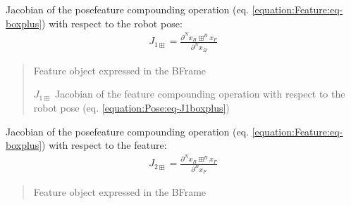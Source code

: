 \documentclass[letterpaper,10pt,english]{sphinxmanual}
\begin{document}
\begin{fulllineitems}
\begin{fulllineitems}
\begin{quote}
\begin{description}
\end{description}\end{quote}

\end{fulllineitems}


\begin{fulllineitems}
\label{\detokenize{Pose:Pose.Pose.J_1boxplus}}
\pysigstartsignatures
{}
\pysigstopsignatures
\sphinxAtStartPar
Jacobian of the pose\sphinxhyphen{}feature compounding operation (eq. \eqref{equation:Feature:eq-boxplus}) with respect to the robot pose:
\begin{equation}\label{equation:Pose:eq-J1boxplus}
\begin{split}J_{1\boxplus}=\frac{\partial  ^Nx_B \boxplus ^Bx_F}{\partial ^Nx_B}\end{split}
\end{equation}\begin{quote}\begin{description}
\sphinxAtStartPar
{} \textendash{} Feature object expressed in the B\sphinxhyphen{}Frame

\sphinxAtStartPar
\(J_{1\boxplus}\) Jacobian of the feature compounding operation with respect to the robot pose (eq. \eqref{equation:Pose:eq-J1boxplus})

\end{description}\end{quote}

\end{fulllineitems}


\begin{fulllineitems}
\label{\detokenize{Pose:Pose.Pose.J_2boxplus}}
\pysigstartsignatures
{}
\pysigstopsignatures
\sphinxAtStartPar
Jacobian of the pose\sphinxhyphen{}feature compounding operation (eq. \eqref{equation:Feature:eq-boxplus}) with respect to the feature:
\begin{equation}\label{equation:Pose:eq-J2boxplus}
\begin{split}J_{2\boxplus}=\frac{\partial  ^Nx_B \boxplus ^Bx_F}{\partial ^Bx_F}\end{split}
\end{equation}\begin{quote}\begin{description}
\sphinxAtStartPar
{} \textendash{} Feature object expressed in the B\sphinxhyphen{}Frame


\end{description}
\end{quote}
\end{fulllineitems}
\end{fulllineitems}
\end{document}
